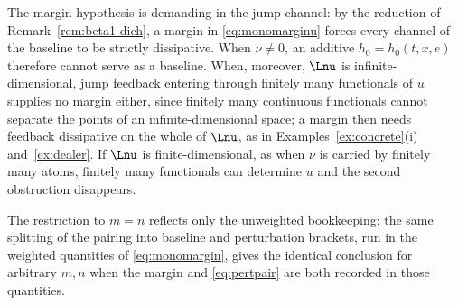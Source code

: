 \noindent The margin hypothesis is demanding in the jump channel: by the reduction of
Remark~\ref{rem:beta1-dich}, a margin in \eqref{eq:monomarginu} forces every channel of
the baseline to be strictly dissipative. When $\nu\neq0$, an additive $h_0=h_0(t,x,e)$
therefore cannot serve as a baseline. When, moreover, $\Lnu$ is infinite-dimensional,
jump feedback entering through finitely many functionals of $u$ supplies no margin
either, since finitely many continuous functionals cannot separate the points of an
infinite-dimensional space; a margin then needs feedback
dissipative on the whole of $\Lnu$, as in Examples~\ref{ex:concrete}(i)
and~\ref{ex:dealer}. If $\Lnu$ is finite-dimensional, as when $\nu$ is carried by finitely
many atoms, finitely many functionals can determine $u$ and the second obstruction
disappears.

\begin{remark}\label{rem:generalrank}
The restriction to $m=n$ reflects only the unweighted bookkeeping: the same splitting of
the pairing into baseline and perturbation brackets, run in the weighted quantities of
\eqref{eq:monomargin}, gives the identical conclusion for arbitrary $m,n$ when the margin
and \eqref{eq:pertpair} are both recorded in those quantities.
\end{remark}

